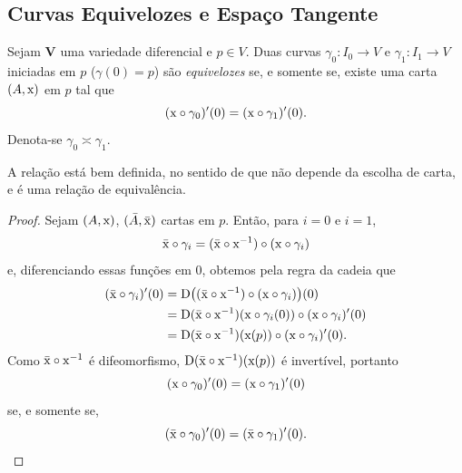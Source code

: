 \subsection{Curvas Equivelozes e Espaço Tangente}

\begin{defi}
Sejam $\bm V$ uma variedade diferencial e $p \in V$. Duas curvas $\gamma_0: I_0 \to V$ e $\gamma_1: I_1 \to V$ iniciadas em $p$ ($\gamma(0)=p$) são \emph{equivelozes} se, e somente se, existe uma carta $(A,\mathrm{x})$ em $p$ tal que
	\begin{equation*}
	(\mathrm{x} \circ \gamma_0)'(0) = (\mathrm{x} \circ \gamma_1)'(0).
	\end{equation*}
Denota-se $\gamma_0 \asymp \gamma_1$.
\end{defi}

A relação está bem definida, no sentido de que não depende da escolha de carta, e é uma relação de equivalência.

\begin{proof}
Sejam $(A,\mathrm{x})$, $(\bar A,\bar {\mathrm{x}})$ cartas em $p$. Então, para $i=0$ e $i=1$,
	\begin{equation*}
	\bar{\mathrm{x}} \circ \gamma_i = (\bar{\mathrm{x}} \circ \mathrm{x}^{-1}) \circ (\mathrm{x} \circ \gamma_i)
	\end{equation*}
e, diferenciando essas funções em $0$, obtemos pela regra da cadeia que
	\begin{align*}
	(\bar{\mathrm{x}} \circ \gamma_i)'(0) &= \mathrm{D} \big( (\bar{\mathrm{x}} \circ \mathrm{x}^{-1}) \circ (\mathrm{x} \circ \gamma_i) \big)(0) \\
	&= \mathrm{D}(\bar{\mathrm{x}} \circ \mathrm{x}^{-1})(\mathrm{x} \circ \gamma_i(0)) \circ (\mathrm{x} \circ \gamma_i)'(0) \\
	&=  \mathrm{D}(\bar{\mathrm{x}} \circ \mathrm{x}^{-1})(\mathrm{x}(p)) \circ (\mathrm{x} \circ \gamma_i)'(0).
	\end{align*}
Como $\bar{\mathrm{x}} \circ \mathrm{x}^{-1}$ é difeomorfismo, $\mathrm{D}(\bar{\mathrm{x}} \circ \mathrm{x}^{-1})(\mathrm{x}(p))$ é invertível, portanto
	\begin{equation*}
	(\mathrm{x} \circ \gamma_0)'(0) = (\mathrm{x} \circ \gamma_1)'(0)
	\end{equation*}
se, e somente se,
	\begin{equation*}
	(\bar{\mathrm{x}} \circ \gamma_0)'(0) = (\bar{\mathrm{x}} \circ \gamma_1)'(0).
	\end{equation*}
\end{proof}

